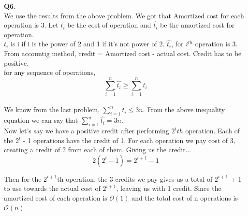 \documentclass[11pt]{article}
\newcommand{\bigO}{\mathcal{O}}
\begin{document}
\vspace{5mm}
\hline
\vspace{5mm}
\textbf{Q6.}\\
We use the results from the above problem. We got that Amortized cost for each operation is 3. Let $t_i$ be the cost of operation and $\hat{t_i}$ be the amortized cost for operation. \\
$t_i$ is i if i is the power of 2 and 1 if it's not power of 2. $\hat{t_i}$, for $i^{th}$ operation is 3.\\
From accountig method, credit = Amortized cost - actual cost. Credit has to be positive.\\
for any sequence of operations, $$\sum_{i=1}^{n} \hat{t_i} \geq \sum_{i=1}^{n} t_i$$\\
We know from the last problem, $\sum_{i=1}^{n} t_i \leq 3n$. From the above inequality equation we can say that $\sum_{i=1}^{n} \hat{t_i} = 3n$. \\
Now let's say we have a positive credit after performing $2^{i}th$ operation. Each of the $2^i$ - 1 operations have the credit of 1. For each operation we pay cost of 3, creating a credit of 2 from each of them. Giving us the credit... \\
$$2(2^{i} -1) = 2^{i+1} - 1$$ 

Then for the $2^{i+1}$th operation, the 3 credits we pay
gives us a total of $2^{i+1}$ + 1 to use towards the actual cost of $2^{i+1}$, leaving us with 1 credit. Since the amortized cost of each operation is $\bigO(1)$ and the total cost of n operations is $\bigO(n)$
\end{document}
